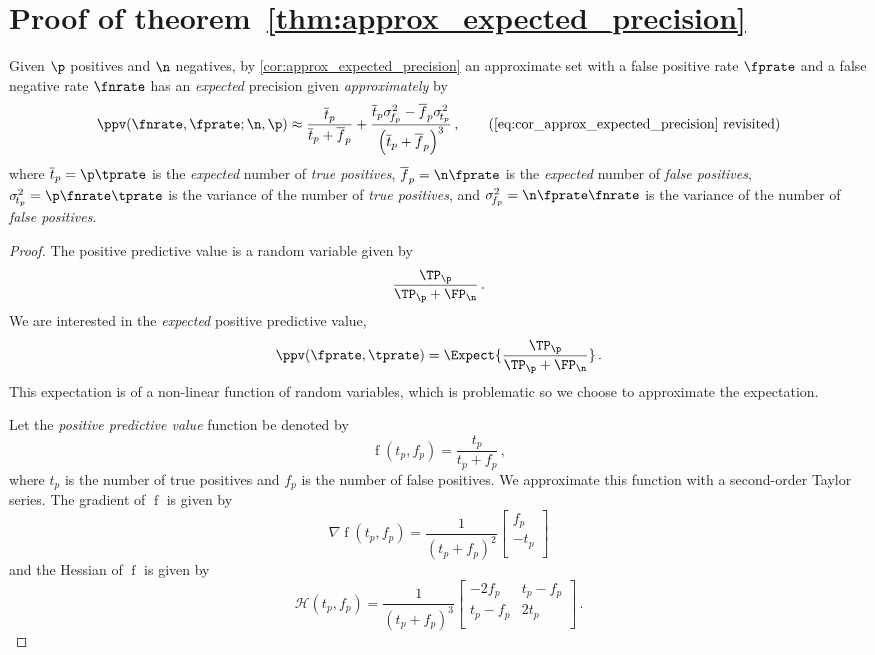 \documentclass[ ../main.tex]{subfiles}
\begin{document}
{\section{Proof of theorem~\ref{thm:approx_expected_precision}}
\label{sec:proof_approx_expected_precision}
Given $\p$ positives and $\n$ negatives, by \cref{cor:approx_expected_precision} an approximate set with a false positive rate $\fprate$ and a false negative rate $\fnrate$ has an \emph{expected} precision given \emph{approximately} by
\begin{equation*}
    \ppv(\fnrate, \fprate ; \n, \p) \approx \frac{\overline{t}_p}{\overline{t}_p + \overline{f}_p} +
    \frac{\overline{t}_p \sigma_{\!f_p}^2 - \overline{f}_p \sigma_{\!t_p}^2}{\left(\overline{t}_p + \overline{f}_p\right)^3}\,,
    \tag{\ref{eq:cor_approx_expected_precision} revisited}
\end{equation*}
where $\overline{t}_p = \p \tprate$ is the \emph{expected} number of \emph{true positives}, $\overline{f}_p =  \n \fprate$ is the \emph{expected} number of \emph{false positives}, $\sigma_{\!t_p}^2 = \p \fnrate \tprate$ is the variance of the number of \emph{true positives}, and $\sigma_{\!f_p}^2 = \n \fprate \fnrate$ is the variance of the number of \emph{false positives}.
\begin{proof}
The positive predictive value is a random variable given by
\begin{equation}
    \frac{\TP_{\p}}{\TP_{\p} + \FP_{\n}}\,.
\end{equation}
We are interested in the \emph{expected} positive predictive value,
\begin{equation}
    \ppv(\fprate,\tprate) = \Expect{\frac{\TP_{\p}}{\TP_{\p} + \FP_{\n}}}\,.
\end{equation}
This expectation is of a non-linear function of random variables, which is problematic so we choose to approximate the expectation.

Let the \emph{positive predictive value} function be denoted by
\begin{equation}
    \operatorname{f}(t_p, f_p) = \frac{t_p}{t_p + f_p}\,,
\end{equation}
where $t_p$ is the number of true positives and $f_p$ is the number of false positives.
We approximate this function with a second-order Taylor series. The gradient of $\operatorname{f}$ is given by
\begin{equation}
    \nabla{\operatorname{f}}(t_p,f_p) =
    \frac{1}{(t_p + f_p)^2}
    \begin{bmatrix}
        f_p\\
        -t_p\\
    \end{bmatrix}
\end{equation}
and the Hessian of $\operatorname{f}$ is given by
\begin{equation}
    \mathcal{H}(t_p,f_p) =
    \frac{1}{(t_p + f_p)^3}
    \begin{bmatrix}
        -2 f_p & t_p-f_p\\
        t_p-f_p & 2 t_p \\
    \end{bmatrix}\,.
\end{equation}


\end{proof}}
\end{document}
